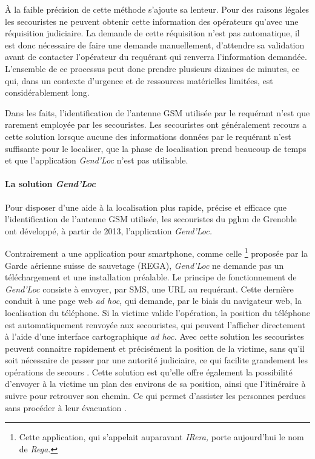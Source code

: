 À la faible précision de cette méthode s'ajoute sa lenteur. Pour des
raisons légales les secouristes ne peuvent obtenir cette information
des opérateurs qu'avec une réquisition judiciaire. La demande de cette
réquisition n'est pas automatique, il est donc nécessaire de faire une
demande manuellement, d'attendre sa validation avant de contacter
l'opérateur du requérant qui renverra l'information
demandée. L'ensemble de ce processus peut donc prendre plusieurs
dizaines de minutes, ce qui, dans un contexte d'urgence et de
ressources matérielles limitées, est considérablement long.

Dans les faits, l'identification de l'antenne GSM utilisée par le
requérant n'est que rarement employée par les secouristes. Les
secouristes ont généralement recours a cette solution lorsque aucune
des informations données par le requérant n'est suffisante pour le
localiser, que la phase de localisation prend beaucoup de temps et que
l’application \emph{Gend'Loc} n'est pas utilisable.

\paragraph{La solution \emph{Gend'Loc}}

Pour disposer d'une aide à la localisation plus rapide, précise et
efficace que l'identification de l'antenne GSM utilisée, les
secouristes du \ac{pghm} de Grenoble ont développé, à partir de 2013,
l’application \emph{Gend'Loc.}

Contrairement a une application pour smartphone, comme celle
\footnote{Cette application, qui s’appelait auparavant \emph{IRera,}
  porte aujourd'hui le nom de \emph{Rega.}}  proposée par la Garde
aérienne suisse de sauvetage (REGA), \emph{Gend'Loc} ne demande pas un
téléchargement et une installation préalable. Le principe de
fonctionnement de \emph{Gend'Loc} consiste à envoyer, par SMS, une URL
au requérant. Cette dernière conduit à une page web \emph{ad hoc,} qui
demande, par le biais du navigateur web, la localisation du
téléphone. Si la victime valide l'opération, la position du téléphone
est automatiquement renvoyée aux secouristes, qui peuvent l'afficher
directement à l'aide d'une interface cartographique \emph{ad hoc.}
Avec cette solution les secouristes peuvent connaitre rapidement et
précisément la position de la victime, sans qu'il soit nécessaire de
passer par une autorité judiciaire, ce qui facilite grandement les
opérations de secours \autocite{Muscat2015}. Cette solution est
qu'elle offre également la possibilité d'envoyer à la victime un plan
des environs de sa position, ainsi que l'itinéraire à suivre pour
retrouver son chemin. Ce qui permet d'assister les personnes perdues
sans procéder à leur évacuation \autocite{Muscat2015}.

